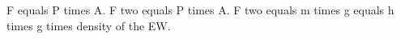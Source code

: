 F equals P times A. F two equals P times A. F two equals m times g equals h times g times density of the EW.